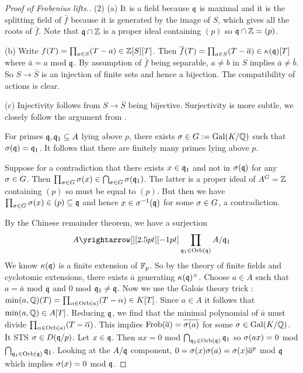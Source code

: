 \documentclass{article}
\begin{document}
\begin{proof}[Proof of Frobenius lifts.]
  (2) (a) It is a field because $\mathfrak{q}$ is maximal
  and it is the splitting field of $\bar{f}$ because
  it is generated by the image of $S$,
  which gives all the roots of $\bar{f}$.
  Note that $\mathfrak{q} \cap \mathbb{Z}$ is a proper ideal containing $(p)$
  so $\mathfrak{q} \cap \mathbb{Z} = (p)$.

  (b) Write $f(T) = \prod_{a \in S}(T - a) \in \mathbb{Z}[S][T]$.
  Then $\overline{f}(T) = \prod_{a \in S}(T - \overline{a}) \in \kappa(\mathfrak{q})[T]$
  where $\bar{a} = a$ mod $\mathfrak{q}$.
  By assumption of $\bar{f}$ being separable,
  $a \neq b$ in $S$ implies $\bar{a} \neq \bar{b}$.
  So $S \to \bar{S}$ is an injection of finite sets and hence a bijection.
  The compatibility of actions is clear.
  
  (c) Injectivity follows from $S \to \bar{S}$ being bijective.
  Surjectivity is more subtle,
  we closely follow the argument from 
  \cite[\href{https://stacks.math.columbia.edu/tag/0BRJ}{Lemma 0BRJ}]{stacks-project}.
  \begin{lem}
    For primes $\mathfrak{q} , \mathfrak{q}_1 \subseteq A$ lying above
    $p$, there exists $\sigma \in G := \operatorname{Gal}(K / \mathbb{Q})$ such that
    $\sigma(\mathfrak{q}) = \mathfrak{q}_1$.
    It follows that there are finitely many primes
    lying above $p$.
    \begin{proof1}
      Suppose for a contradiction that
      there exists $x \in \mathfrak{q}_1$ and not in $\sigma(\mathfrak{q})$ for
      any $\sigma \in G$.
      Then $\prod_{\sigma \in G} \sigma(x) \in \bigcap_{\sigma \in G} \sigma(\mathfrak{q}_1)$.
      The latter is a proper ideal of $A^G = \mathbb{Z}$ containing $(p)$
      so must be equal to $(p)$.
      But then we have $\prod_{\sigma \in G} \sigma(x) \in (p) \subseteq \mathfrak{q}$
      and hence $x \in \sigma^{-1}(\mathfrak{q})$ for some $\sigma \in G$,
      a contradiction.
    \end{proof1}
  \end{lem}
  By the Chinese remainder theorem, we have a surjection
  \[
    A \map{}{}
    \prod_{\f{q}_1 \in \ORB(\f{q})} A / \f{q}_1
  \]
  We know $\kappa(\mathfrak{q})$ is a finite extension of $\mathbb{F}_p$.
  So by the theory of finite fields and cyclotomic extensions,
  there exists $\bar{a}$ generating $\kappa(\mathfrak{q})^\times$.
  Choose $a \in A$ such that $a = \bar{a}$ mod $\mathfrak{q}$
  and $0$ mod $\mathfrak{q}_1 \neq \mathfrak{q}$.
  Now we use the Galois theory trick : 
  $\min(a , \mathbb{Q})(T) = \prod_{\alpha \in \operatorname{Orb}(a)} (T - \alpha) \in K[T]$.
  Since $a \in A$ it follows that $\min(a , \mathbb{Q}) \in A[T]$.
  Reducing $\mathfrak{q}$, we find that the minimal polynomial
  of $\bar{a}$ must divide $\prod_{\alpha \in \operatorname{Orb}(a)} (T - \overline{\alpha})$.
  This implies $\operatorname{Frob}(\overline{a}) = \overline{\sigma(a)}$ for some 
  $\sigma \in \operatorname{Gal}(K / \mathbb{Q})$.
  It STS $\sigma \in D(\mathfrak{q} / p)$.
  Let $x \in \mathfrak{q}$.
  Then $a x = 0$ mod $\bigcap_{\mathfrak{q}_1 \in \operatorname{Orb}(\mathfrak{q})} \mathfrak{q}_1$
  so $\sigma(a x) = 0$ mod $\bigcap_{\mathfrak{q}_1 \in \operatorname{Orb}(\mathfrak{q})} \mathfrak{q}_1$.
  Looking at the $A / \mathfrak{q}$ component,
  $0 = \sigma(x) \sigma(a) = \sigma(x) \overline{a}^p$ mod $\mathfrak{q}$ 
  which implies $\sigma(x) = 0$ mod $\mathfrak{q}$.
\end{proof}
\end{document}
